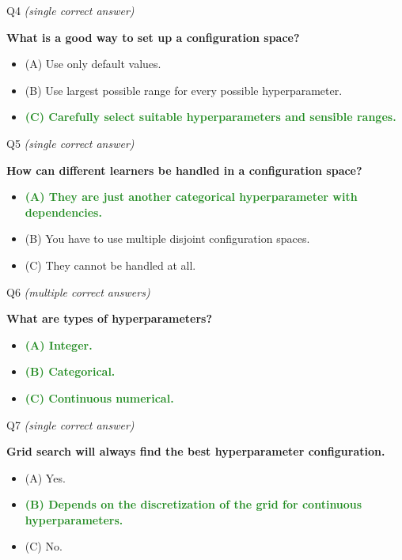 \documentclass[main]{subfiles}
\newcommand{\correct}[1]{\textcolor{ForestGreen}{\textbf{#1} \checkmark}}
\newcommand{\wrong}[1]{#1}
\begin{document}
\begin{frame}{Q4 \hfill \small\normalfont\textit{(single correct answer)}}

\textbf{What is a good way to set up a configuration space?}

\begin{itemize}
    \item \wrong{(A) \; Use only default values.}
    \item \wrong{(B) \; Use largest possible range for every possible hyperparameter.}
    \item \correct{(C) \; Carefully select suitable hyperparameters and sensible ranges.}
\end{itemize}

\end{frame}

\begin{frame}{Q5 \hfill \small\normalfont\textit{(single correct answer)}}

\textbf{How can different learners be handled in a configuration space?}

\begin{itemize}
    \item \correct{(A) \; They are just another categorical hyperparameter with dependencies.}
    \item \wrong{(B) \; You have to use multiple disjoint configuration spaces.}
    \item \wrong{(C) \; They cannot be handled at all.}
\end{itemize}

\end{frame}

\begin{frame}{Q6 \hfill \small\normalfont\textit{(multiple correct answers)}}

\textbf{What are types of hyperparameters?}

\begin{itemize}
    \item \correct{(A) \; Integer.}
    \item \correct{(B) \; Categorical.}
    \item \correct{(C) \; Continuous numerical.}
\end{itemize}

\end{frame}

\begin{frame}{Q7 \hfill \small\normalfont\textit{(single correct answer)}}

\textbf{Grid search will always find the best hyperparameter configuration.}

\begin{itemize}
    \item \wrong{(A) \; Yes.}
    \item \correct{(B) \; Depends on the discretization of the grid for continuous hyperparameters.}
    \item \wrong{(C) \; No.}
\end{itemize}

\end{frame}
\end{document}
